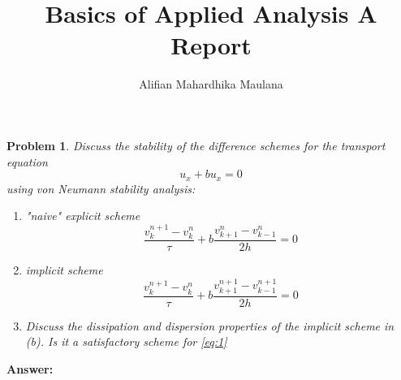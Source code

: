 \documentclass[a4paper,12pt]{article}
\title{Basics of Applied Analysis A Report}
\author{Alifian Mahardhika Maulana}
\newtheorem{prob}{Problem}[]
\begin{document}
\maketitle
\begin{prob}
	Discuss the stability of the difference schemes for the transport equation
	\begin{equation}\label{eq:1}
	u_x + bu_x = 0
	\end{equation}
	using von Neumann stability analysis:
	\begin{enumerate}
		\item "naive" explicit scheme
		\begin{equation}\label{eq:2}
		\frac{v_k^{n+1}-v_k^n}{\tau} + b \frac{v_{k+1}^{n}-v_{k-1}^n}{2h} = 0
		\end{equation}
		
		\item implicit scheme
		\begin{equation}\label{eq:3}
		\frac{v_k^{n+1}-v_k^n}{\tau} + b \frac{v_{k+1}^{n+1}-v_{k-1}^{n+1}}{2h} = 0
		\end{equation}
		
		\item Discuss the dissipation and dispersion properties of the implicit scheme in (b). Is it a satisfactory scheme for \eqref{eq:1}
	\end{enumerate}
\end{prob}
\textbf{Answer:}
\end{document}
